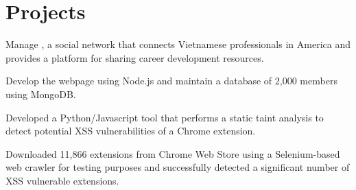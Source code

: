 \documentclass[]{deedy_format_Hien}
\begin{document}
\begin{minipage}[t]{0.66\textwidth}

\section{Projects}
\vspace{1mm}
\justify
\begin{tightemize}
\item Manage , a social network that connects Vietnamese professionals in America and provides a platform for sharing career development resources. 
\item Develop the webpage using Node.js and maintain a database of 2,000 members using MongoDB.
\end{tightemize}
\vspace{\topsep}
\sectionsep


\vspace{1mm}
\justify
\begin{tightemize}
\item Developed a Python/Javascript tool that performs a static taint analysis to detect potential XSS vulnerabilities of a Chrome extension. 
\item Downloaded 11,866 extensions from Chrome Web Store using a Selenium-based web crawler for testing purposes and successfully detected a significant number of XSS vulnerable extensions.  
\end{tightemize}
\vspace{\topsep}
\sectionsep


\end{minipage}
\end{document}
